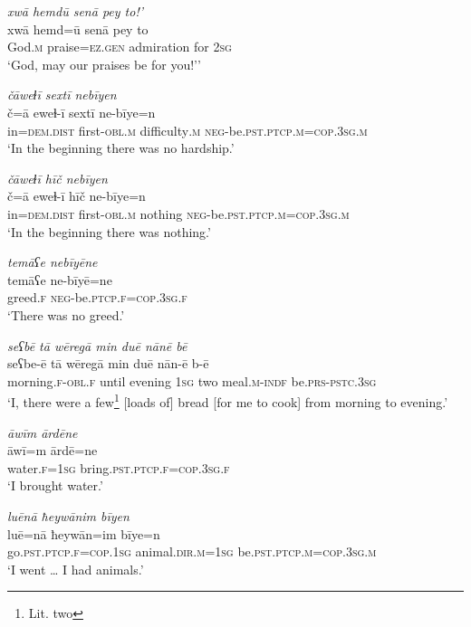 \ea \label{ŽE.54}
\textit{xwā hemdū senā pey to!’} \\ 
\gll xwā hemd=ū senā pey to \\ 
 God\textsc{.m} praise\textsc{\textsc{=ez.gen}} admiration for \textsc{2sg} \\ 
\glt `God, may our praises be for you!’'
\z 
 
\ea \label{ŽE.56}
\textit{čāweɫī sextī nebīyen} \\ 
\gll č=ā eweɫ-ī sextī ne-bīye=n \\ 
 in=\textsc{dem.dist} first\textsc{-obl}\textsc{.m} difficulty\textsc{.m} \textsc{neg-}be\textsc{.pst}\textsc{.ptcp}\textsc{.m}\textsc{=cop}\textsc{.3sg}\textsc{.m} \\ 
\glt `In the beginning there was no hardship.'
\z 
 
\ea \label{ŽE.57}
\textit{čāweɫī hīč nebīyen} \\ 
\gll č=ā eweɫ-ī hīč ne-bīye=n \\ 
 in=\textsc{dem.dist} first\textsc{-obl}\textsc{.m} nothing \textsc{neg-}be\textsc{.pst}\textsc{.ptcp}\textsc{.m}\textsc{=cop}\textsc{.3sg}\textsc{.m} \\ 
\glt `In the beginning there was nothing.'
\z 
 
\ea \label{ŽE.58}
\textit{temāʕe nebīyēne} \\ 
\gll temāʕe ne-bīyē=ne \\ 
 greed\textsc{.f} \textsc{neg-}be\textsc{.ptcp}\textsc{.f}\textsc{=cop}\textsc{.3sg}\textsc{.f} \\ 
\glt `There was no greed.'
\z 
 
\ea \label{ŽE.59}
\textit{seʕbē tā wēregā min duē nānē bē} \\ 
\gll seʕbe-ē tā wēregā min duē nān-ē b-ē \\ 
 morning\textsc{.f}\textsc{-obl}\textsc{.f} until evening \textsc{1sg} two meal\textsc{.m}\textsc{-indf} be\textsc{.prs}\textsc{-pstc}\textsc{.3sg} \\ 
\glt `I, there were a few\footnote{Lit. two} [loads of] bread [for me to cook] from morning to evening.'
\z 
 
\ea \label{ŽE.61}
\textit{āwīm ārdēne} \\ 
\gll āwī=m ārdē=ne \\ 
 water\textsc{.f}\textsc{=\textsc{1sg}} bring\textsc{.pst}\textsc{.ptcp}\textsc{.f}\textsc{=cop}\textsc{.3sg}\textsc{.f} \\ 
\glt `I brought water.'
\z 
 
\ea \label{ŽE.62}
\textit{luēnā ħeywānim bīyen} \\ 
\gll luē=nā ħeywān=im bīye=n \\ 
 go\textsc{.pst}\textsc{.ptcp}\textsc{.f}\textsc{=cop}\textsc{.\textsc{1sg}} animal\textsc{.dir}\textsc{.m}\textsc{=\textsc{1sg}} be\textsc{.pst}\textsc{.ptcp}\textsc{.m}\textsc{=cop}\textsc{.3sg}\textsc{.m} \\ 
\glt `I went … I had animals.'
\z 
 
